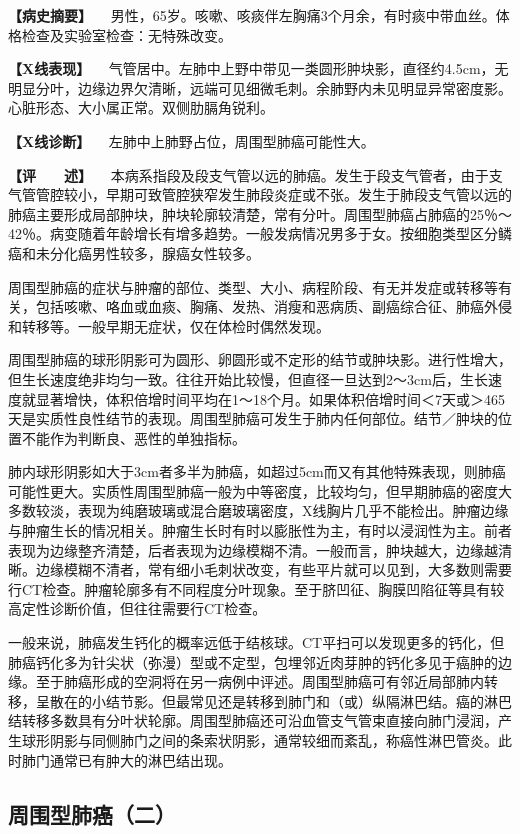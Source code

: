 \textbf{【病史摘要】}
　男性，65岁。咳嗽、咳痰伴左胸痛3个月余，有时痰中带血丝。体格检查及实验室检查：无特殊改变。

\textbf{【X线表现】}
　气管居中。左肺中上野中带见一类圆形肿块影，直径约4.5cm，无明显分叶，边缘边界欠清晰，远端可见细微毛刺。余肺野内未见明显异常密度影。心脏形态、大小属正常。双侧肋膈角锐利。

\textbf{【X线诊断】} 　左肺中上肺野占位，周围型肺癌可能性大。

\textbf{【评　　述】}
　本病系指段及段支气管以远的肺癌。发生于段支气管者，由于支气管管腔较小，早期可致管腔狭窄发生肺段炎症或不张。发生于肺段支气管以远的肺癌主要形成局部肿块，肿块轮廓较清楚，常有分叶。周围型肺癌占肺癌的25％～42％。病变随着年龄增长有增多趋势。一般发病情况男多于女。按细胞类型区分鳞癌和未分化癌男性较多，腺癌女性较多。

周围型肺癌的症状与肿瘤的部位、类型、大小、病程阶段、有无并发症或转移等有关，包括咳嗽、咯血或血痰、胸痛、发热、消瘦和恶病质、副癌综合征、肺癌外侵和转移等。一般早期无症状，仅在体检时偶然发现。

周围型肺癌的球形阴影可为圆形、卵圆形或不定形的结节或肿块影。进行性增大，但生长速度绝非均匀一致。往往开始比较慢，但直径一旦达到2～3cm后，生长速度就显著增快，体积倍增时间平均在1～18个月。如果体积倍增时间＜7天或＞465天是实质性良性结节的表现。周围型肺癌可发生于肺内任何部位。结节／肿块的位置不能作为判断良、恶性的单独指标。

肺内球形阴影如大于3cm者多半为肺癌，如超过5cm而又有其他特殊表现，则肺癌可能性更大。实质性周围型肺癌一般为中等密度，比较均匀，但早期肺癌的密度大多数较淡，表现为纯磨玻璃或混合磨玻璃密度，X线胸片几乎不能检出。肿瘤边缘与肿瘤生长的情况相关。肿瘤生长时有时以膨胀性为主，有时以浸润性为主。前者表现为边缘整齐清楚，后者表现为边缘模糊不清。一般而言，肿块越大，边缘越清晰。边缘模糊不清者，常有细小毛刺状改变，有些平片就可以见到，大多数则需要行CT检查。肿瘤轮廓多有不同程度分叶现象。至于脐凹征、胸膜凹陷征等具有较高定性诊断价值，但往往需要行CT检查。

一般来说，肺癌发生钙化的概率远低于结核球。CT平扫可以发现更多的钙化，但肺癌钙化多为针尖状（弥漫）型或不定型，包埋邻近肉芽肿的钙化多见于癌肿的边缘。至于肺癌形成的空洞将在另一病例中评述。周围型肺癌可有邻近局部肺内转移，呈散在的小结节影。但最常见还是转移到肺门和（或）纵隔淋巴结。癌的淋巴结转移多数具有分叶状轮廓。周围型肺癌还可沿血管支气管束直接向肺门浸润，产生球形阴影与同侧肺门之间的条索状阴影，通常较细而紊乱，称癌性淋巴管炎。此时肺门通常已有肿大的淋巴结出现。

\subsection{周围型肺癌（二）}

